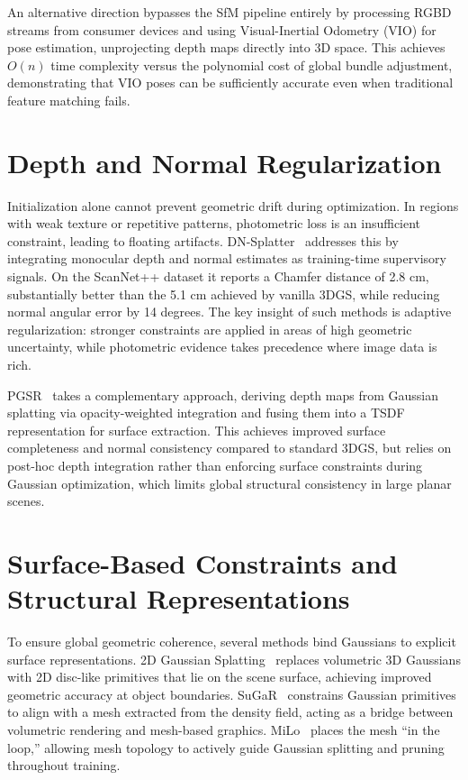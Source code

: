 An alternative direction bypasses the SfM pipeline entirely by processing RGBD streams from consumer devices and using Visual-Inertial Odometry (VIO) for pose estimation, unprojecting depth maps directly into 3D space. This achieves $O(n)$ time complexity versus the polynomial cost of global bundle adjustment, demonstrating that VIO poses can be sufficiently accurate even when traditional feature matching fails.

\section{Depth and Normal Regularization}

Initialization alone cannot prevent geometric drift during optimization. In regions with weak texture or repetitive patterns, photometric loss is an insufficient constraint, leading to floating artifacts. DN-Splatter~\cite{dn_splatter} addresses this by integrating monocular depth and normal estimates as training-time supervisory signals. On the ScanNet++ dataset it reports a Chamfer distance of 2.8 cm, substantially better than the 5.1 cm achieved by vanilla 3DGS, while reducing normal angular error by 14 degrees. The key insight of such methods is adaptive regularization: stronger constraints are applied in areas of high geometric uncertainty, while photometric evidence takes precedence where image data is rich.

PGSR~\cite{pgsr} takes a complementary approach, deriving depth maps from Gaussian splatting via opacity-weighted integration and fusing them into a TSDF representation for surface extraction. This achieves improved surface completeness and normal consistency compared to standard 3DGS, but relies on post-hoc depth integration rather than enforcing surface constraints during Gaussian optimization, which limits global structural consistency in large planar scenes.

\section{Surface-Based Constraints and Structural Representations}

To ensure global geometric coherence, several methods bind Gaussians to explicit surface representations. 2D Gaussian Splatting~\cite{huang20242dgs} replaces volumetric 3D Gaussians with 2D disc-like primitives that lie on the scene surface, achieving improved geometric accuracy at object boundaries. SuGaR~\cite{sugar} constrains Gaussian primitives to align with a mesh extracted from the density field, acting as a bridge between volumetric rendering and mesh-based graphics. MiLo~\cite{milo2024} places the mesh ``in the loop,'' allowing mesh topology to actively guide Gaussian splitting and pruning throughout training.

